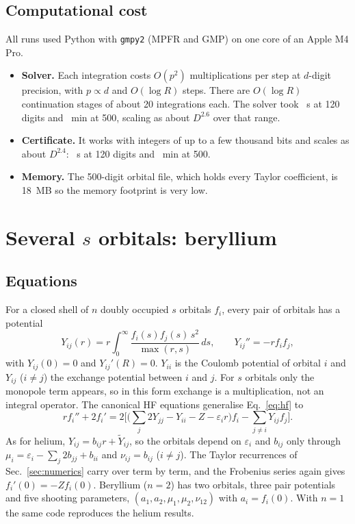 \documentclass[aps,pra,reprint,superscriptaddress,amsmath,amssymb,longbibliography]{revtex4-2}
\begin{document}
\subsection{Computational cost}

All runs used Python with \texttt{gmpy2} (MPFR and GMP) on one core of an Apple M4 Pro.
\begin{itemize}
\item \textbf{Solver.} Each integration costs $O(p^2)$ multiplications per step at $d$-digit precision, with $p\propto d$ and $O(\log R)$ steps. There are $O(\log R)$ continuation stages of about 20 integrations each. The solver took \secRunA~s at 120 digits and \minA~min at 500, scaling as about $D^{2.6}$ over that range.
\item \textbf{Certificate.} It works with integers of up to a few thousand bits and scales as about $D^{2.4}$: \certRunA~s at 120 digits and \certMinA~min at 500.
\item \textbf{Memory.} The 500-digit orbital file, which holds every Taylor coefficient, is 18~MB so the memory footprint is very low.
\end{itemize}

\section{Several $s$ orbitals: beryllium}\label{sec:be}

\subsection{Equations}

For a closed shell of $n$ doubly occupied $s$ orbitals $f_i$, every pair of orbitals has a potential
\begin{equation}
Y_{ij}(r)=r\int_0^\infty\frac{f_i(s)f_j(s)\,s^2}{\max(r,s)}\,ds,\qquad Y_{ij}''=-rf_if_j,
\end{equation}
with $Y_{ij}(0)=0$ and $Y_{ij}'(R)=0$. $Y_{ii}$ is the Coulomb potential of orbital $i$ and $Y_{ij}$ ($i\ne j$) the exchange potential between $i$ and $j$. For $s$ orbitals only the monopole term appears, so in this form exchange is a multiplication, not an integral operator. The canonical HF equations generalise Eq.~\eqref{eq:hf} to
\begin{equation}
rf_i''+2f_i'=2\Big[\Big(\sum_j2Y_{jj}-Y_{ii}-Z-\varepsilon_ir\Big)f_i-\sum_{j\ne i}Y_{ij}f_j\Big]. \label{eq:ns}
\end{equation}
As for helium, $Y_{ij}=b_{ij}r+\tilde Y_{ij}$, so the orbitals depend on $\varepsilon_i$ and $b_{ij}$ only through $\mu_i=\varepsilon_i-\sum_j2b_{jj}+b_{ii}$ and $\nu_{ij}=b_{ij}$ ($i\ne j$). The Taylor recurrences of Sec.~\ref{sec:numerics} carry over term by term, and the Frobenius series again gives $f_i'(0)=-Zf_i(0)$. Beryllium ($n=2$) has two orbitals, three pair potentials and five shooting parameters, $(a_1,a_2,\mu_1,\mu_2,\nu_{12})$ with $a_i=f_i(0)$. With $n=1$ the same code reproduces the helium results.
\end{document}
